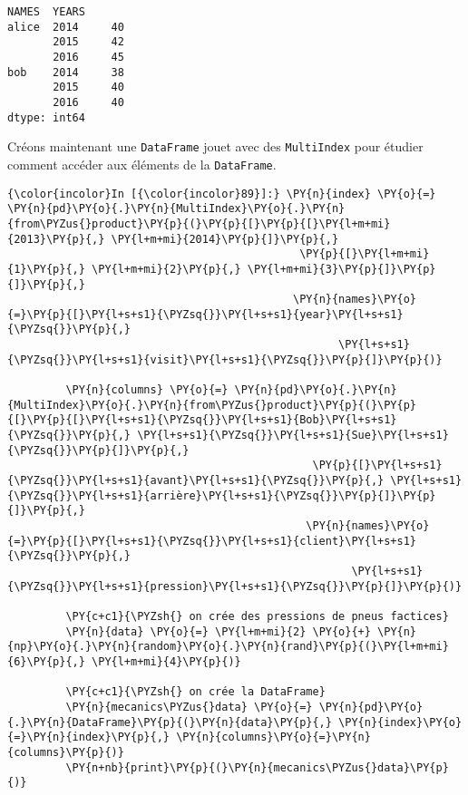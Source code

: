     \begin{Verbatim}[commandchars=\\\{\},frame=single,framerule=0.3mm,rulecolor=\color{cellframecolor}]
NAMES  YEARS
alice  2014     40
       2015     42
       2016     45
bob    2014     38
       2015     40
       2016     40
dtype: int64
\end{Verbatim}

    Créons maintenant une \texttt{DataFrame} jouet avec des
\texttt{MultiIndex} pour étudier comment accéder aux éléments de la
\texttt{DataFrame}.

    \begin{Verbatim}[commandchars=\\\{\},frame=single,framerule=0.3mm,rulecolor=\color{cellframecolor}]
{\color{incolor}In [{\color{incolor}89}]:} \PY{n}{index} \PY{o}{=} \PY{n}{pd}\PY{o}{.}\PY{n}{MultiIndex}\PY{o}{.}\PY{n}{from\PYZus{}product}\PY{p}{(}\PY{p}{[}\PY{p}{[}\PY{l+m+mi}{2013}\PY{p}{,} \PY{l+m+mi}{2014}\PY{p}{]}\PY{p}{,}
                                             \PY{p}{[}\PY{l+m+mi}{1}\PY{p}{,} \PY{l+m+mi}{2}\PY{p}{,} \PY{l+m+mi}{3}\PY{p}{]}\PY{p}{]}\PY{p}{,}
                                            \PY{n}{names}\PY{o}{=}\PY{p}{[}\PY{l+s+s1}{\PYZsq{}}\PY{l+s+s1}{year}\PY{l+s+s1}{\PYZsq{}}\PY{p}{,}
                                                   \PY{l+s+s1}{\PYZsq{}}\PY{l+s+s1}{visit}\PY{l+s+s1}{\PYZsq{}}\PY{p}{]}\PY{p}{)}
         
         \PY{n}{columns} \PY{o}{=} \PY{n}{pd}\PY{o}{.}\PY{n}{MultiIndex}\PY{o}{.}\PY{n}{from\PYZus{}product}\PY{p}{(}\PY{p}{[}\PY{p}{[}\PY{l+s+s1}{\PYZsq{}}\PY{l+s+s1}{Bob}\PY{l+s+s1}{\PYZsq{}}\PY{p}{,} \PY{l+s+s1}{\PYZsq{}}\PY{l+s+s1}{Sue}\PY{l+s+s1}{\PYZsq{}}\PY{p}{]}\PY{p}{,}
                                               \PY{p}{[}\PY{l+s+s1}{\PYZsq{}}\PY{l+s+s1}{avant}\PY{l+s+s1}{\PYZsq{}}\PY{p}{,} \PY{l+s+s1}{\PYZsq{}}\PY{l+s+s1}{arrière}\PY{l+s+s1}{\PYZsq{}}\PY{p}{]}\PY{p}{]}\PY{p}{,}
                                              \PY{n}{names}\PY{o}{=}\PY{p}{[}\PY{l+s+s1}{\PYZsq{}}\PY{l+s+s1}{client}\PY{l+s+s1}{\PYZsq{}}\PY{p}{,}
                                                     \PY{l+s+s1}{\PYZsq{}}\PY{l+s+s1}{pression}\PY{l+s+s1}{\PYZsq{}}\PY{p}{]}\PY{p}{)}
         
         \PY{c+c1}{\PYZsh{} on crée des pressions de pneus factices}
         \PY{n}{data} \PY{o}{=} \PY{l+m+mi}{2} \PY{o}{+} \PY{n}{np}\PY{o}{.}\PY{n}{random}\PY{o}{.}\PY{n}{rand}\PY{p}{(}\PY{l+m+mi}{6}\PY{p}{,} \PY{l+m+mi}{4}\PY{p}{)}
         
         \PY{c+c1}{\PYZsh{} on crée la DataFrame}
         \PY{n}{mecanics\PYZus{}data} \PY{o}{=} \PY{n}{pd}\PY{o}{.}\PY{n}{DataFrame}\PY{p}{(}\PY{n}{data}\PY{p}{,} \PY{n}{index}\PY{o}{=}\PY{n}{index}\PY{p}{,} \PY{n}{columns}\PY{o}{=}\PY{n}{columns}\PY{p}{)}
         \PY{n+nb}{print}\PY{p}{(}\PY{n}{mecanics\PYZus{}data}\PY{p}{)}
\end{Verbatim}


